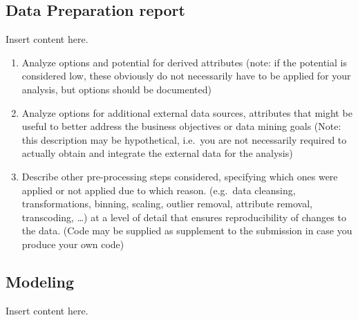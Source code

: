 \documentclass[sigchi]{acmart}
\def\tightlist{}
\begin{document}
\hypertarget{data-preparation-report}{%
\subsection{Data Preparation report}\label{data-preparation-report}}

Insert content here.

\begin{enumerate}
\def\labelenumi{\alph{enumi}.}
\tightlist
\item
  Analyze options and potential for derived attributes (note: if the potential is considered low, these obviously do not necessarily have to be applied for your analysis, but options should be documented)
\item
  Analyze options for additional external data sources, attributes that might be useful to better address the business objectives or data mining goals (Note: this description may be hypothetical, i.e.~you are not necessarily required to actually obtain and integrate the external data for the analysis)
\item
  Describe other pre-processing steps considered, specifying which ones were applied or not applied due to which reason. (e.g.~data cleansing, transformations, binning, scaling, outlier removal, attribute removal, transcoding, \ldots) at a level of detail that ensures reproducibility of changes to the data. (Code may be supplied as supplement to the submission in case you produce your own code)
\end{enumerate}

\hypertarget{modeling}{%
\subsection{Modeling}\label{modeling}}

Insert content here.
\end{document}
